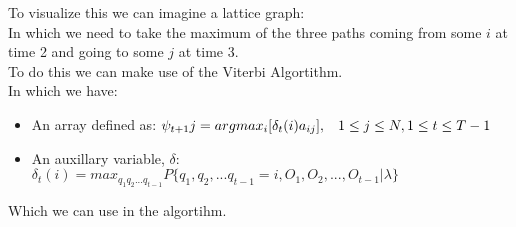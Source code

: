 \documentclass[12pt]{report}
\begin{document}
\vspace{2 mm}
To visualize this we can imagine a lattice graph:
\newline
\vspace{5 mm}
\latice{}
\vspace {1 mm}\\
In which we need to take the maximum of the three paths coming from some $i$ at time 2 and going to some $j$ at time 3. \\

To do this we can make use of the Viterbi Algortithm.
\\
In which we have:
\begin{itemize}
	\item An array defined as: $\psi_{t+1}j = argmax_i[\delta_t(i)a_{ij}], \hspace{3 mm} 1 \leq j \leq N, 1 \leq t \leq T-1$
	\item An auxillary variable, $\delta$: $\delta_t(i) = max_{q_1q_2...q_{t-1}}P\{q_1,q_2,...q_{t-1}=i,O_1,O_2,...,O_{t-1}|\lambda\}$
\end{itemize}
Which we can use in the algortihm.
\end{document}
